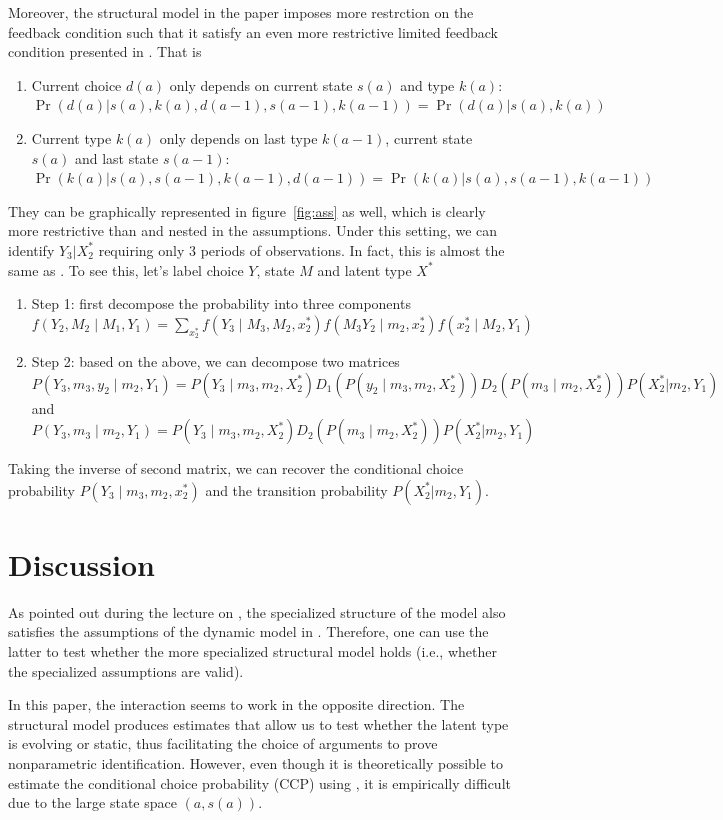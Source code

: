 \documentclass[12pt]{article}
\begin{document}
Moreover, the structural model in the paper imposes more restrction on the feedback condition such that it satisfy an even more restrictive limited feedback condition presented in \citet{hu2017simple}. That is 
\begin{enumerate}
    \item Current choice $d(a)$ only depends on current state $s(a)$ and type $k(a)$: $\Pr(d(a)|s(a),k(a),d(a-1),s(a-1),k(a-1))=\Pr(d(a)|s(a),k(a))$
    \item Current type $k(a)$ only depends on last type $k(a-1)$, current state $s(a)$ and last state $s(a-1)$: $\Pr(k(a)|s(a),s(a-1),k(a-1),d(a-1))=\Pr(k(a)|s(a),s(a-1),k(a-1))$
\end{enumerate}
They can be graphically represented in figure~\ref{fig:ass} as well, which is clearly more restrictive than and nested in the \citet{hu2012nonparametric} assumptions. Under this setting, we can identify $Y_3|X_2^*$ requiring only 3 periods of observations.  In fact, this is almost the same as \citet{hu2008identification}. To see this, let's label choice $Y$, state $M$ and latent type $X^*$
\begin{enumerate}
    \item Step 1: first decompose the probability into three components
$f(Y_2, M_2 \mid M_1, Y_1) = \sum_{x_2^*} f(Y_3 \mid M_3,M_2, x_2^*) f(M_3 Y_2 \mid m_2, x_2^*) f(x_2^* \mid M_2, Y_1)$
\item Step 2: based on the above, we can decompose two matrices
$P(Y_3, m_3 ,y_2 \mid m_2, Y_1) = P(Y_3 \mid m_3, m_2, X_2^*) D_1 (P(y_2 \mid m_3, m_2, X_2^*))D_2(P(m_3\mid m_2,X_2^*))P(X_2^*|m_2,Y_1)$ and 
$P(Y_3, m_3\mid m_2, Y_1) = P(Y_3 \mid m_3, m_2, X_2^*) D_2(P(m_3\mid m_2,X_2^*))P(X_2^*|m_2,Y_1)$
\end{enumerate}
Taking the inverse of second matrix, we can recover the conditional choice probability $P(Y_3 \mid m_3, m_2, x_2^*)$ and the transition probability $P(X_2^*|m_2,Y_1)$. 

\section{Discussion}
As pointed out during the lecture on \citet{postel2002equilibrium}, the specialized structure of the model also satisfies the assumptions of the dynamic model in \citet{bonhomme2019distributional}. Therefore, one can use the latter to test whether the more specialized structural model holds (i.e., whether the specialized assumptions are valid).

In this paper, the interaction seems to work in the opposite direction. The structural model produces estimates that allow us to test whether the latent type is evolving or static, thus facilitating the choice of arguments to prove nonparametric identification. However, even though it is theoretically possible to estimate the conditional choice probability (CCP) using \citet{hu2017simple}, it is empirically difficult due to the large state space \( (a, s(a)) \).
\end{document}
